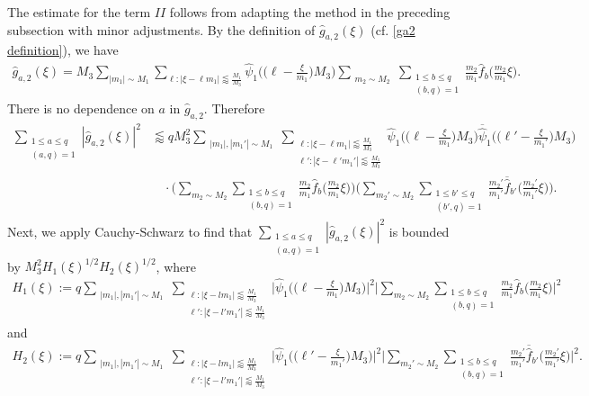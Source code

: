 \documentclass[12pt]{amsart}
\theoremstyle{definition}
\theoremstyle{plain}
\theoremstyle{remark}
\numberwithin{equation}{section}
\numberwithin{theorem}{section}
\numberwithin{equation}{section}
\begin{document}
	The estimate for the term $II$ follows from adapting the method in the preceding subsection with minor adjustments. By the definition of $\hat{g}_{a,2}(\xi)$ (cf. \eqref{ga2 definition}), we have
	\begin{align*}
		\hat{g}_{a,2}(\xi)= M_3\sum_{|m_1| \sim M_1} \sum_{\ell: |\xi - \ell m_{1}|\lessapprox \frac{M_{1}}{M_{3}} }\hat{\psi}_{1}\bigg(\bigg(\ell - \frac{\xi}{m_{1}}\bigg)M_{3}\bigg) \sum_{\substack{m_{2}\sim M_{2}}} \sum_{\substack{1 \leq b \leq q \\ (b, q)=1}} \frac{m_{2}}{m_{1}}\hat{f}_{b}\bigg(\frac{m_{2}}{m_{1}}\xi\bigg).
	\end{align*}
	There is no dependence on $a$ in $\hat{g}_{a,2}$. Therefore
	\begin{align*}
		\sum_{\substack{1 \leq a \leq q \\ (a, q)=1}}|\hat{g}_{a,2}(\xi)|^{2}&\lessapprox 
		q
		M_{3}^{2}\sum_{\substack{|m_{1}|, |m_1'|\sim M_{1}}}\sum_{\substack{\ell: |\xi - \ell m_{1}|\lessapprox \frac{M_{1}}{M_{3}} \\ \ell': |\xi - \ell' m_{1}'|\lessapprox \frac{M_{1}}{M_{3}} }}\hat{\psi}_{1}\bigg(\bigg(\ell-\frac{\xi}{m_{1}}\bigg)M_{3}\bigg)
		\overline{\hat{\psi}}_{1}\bigg(\bigg(\ell'-\frac{\xi}{m_{1}'}\bigg)M_{3}\bigg)
		\\
		&\quad\cdot\bigg(\sum_{m_{2}\sim M_{2}}
		\sum_{\substack{1 \leq b \leq q \\ (b, q)=1}}\frac{m_{2}}{m_{1}}\hat{f}_{b}\bigg(\frac{m_{2}}{m_{1}}\xi\bigg)
		\bigg)\bigg(\sum_{m_{2}'\sim M_{2}}
		\sum_{\substack{1 \leq b' \leq q \\ (b', q)=1}}\frac{m_{2}'}{m_{1}'}\overline{\hat{f}}_{b'}\bigg(\frac{m_{2}'}{m_{1}'}\xi\bigg)\bigg).
	\end{align*}
	Next, we apply Cauchy-Schwarz to find that $\sum_{\substack{1 \leq a \leq q \\ (a, q)=1}}|\hat{g}_{a,2}(\xi)|^{2}$ is bounded by $M_3^2H_1(\xi)^{1/2}H_2(\xi)^{1/2}$, where 
	\begin{align*}
		H_1(\xi):= q \sum_{\substack{|m_1|,|m_1'|\sim M_1}} \sum_{\substack{\ell : |\xi-lm_1| \lessapprox \frac{M_1}{M_3} \\ \ell':|\xi-l'm_1'| \lessapprox \frac{M_1}{M_3}}} \bigg|\hat{\psi}_{1}\bigg(\bigg(\ell-\frac{\xi}{m_{1}}\bigg)M_{3}\bigg) \bigg|^2 \bigg|\sum_{m_2 \sim M_2}\sum_{\substack{1 \leq b \leq q \\ (b,q)=1}} \frac{m_2}{m_1} \hat{f}_b \bigg(\frac{m_2}{m_1}\xi\bigg)\bigg|^2 
	\end{align*}
	and
	\begin{align*}
		H_2(\xi):= q \sum_{\substack{|m_1|,|m_1'|\sim M_1}} \sum_{\substack{\ell : |\xi-lm_1| \lessapprox \frac{M_1}{M_3} \\ \ell':|\xi-l'm_1'| \lessapprox \frac{M_1}{M_3}}} \bigg|\hat{\psi}_{1}\bigg(\bigg(\ell'-\frac{\xi}{m_{1}'}\bigg)M_{3}\bigg)\bigg|^2 \bigg|\sum_{m_2' \sim M_2}\sum_{\substack{1 \leq b \leq q \\ (b,q)=1}} \frac{m_2'}{m_1'} \overline{\hat{f}}_{b'} \bigg(\frac{m_2'}{m_1'}\xi\bigg)\bigg|^2 .
	\end{align*}
\end{document}
